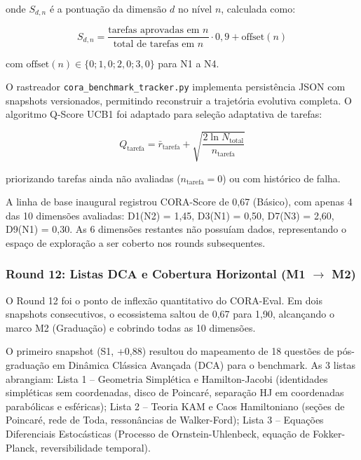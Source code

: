 onde $S_{d,n}$ é a pontuação da dimensão $d$ no nível $n$, calculada como:

\begin{equation}
S_{d,n} = \frac{\text{tarefas aprovadas em } n}{\text{total de tarefas em } n} \cdot 0{,}9 + \text{offset}(n)
\end{equation}

com $\text{offset}(n) \in \{0; 1{,}0; 2{,}0; 3{,}0\}$ para N1 a N4.

O rastreador \texttt{cora\_benchmark\_tracker.py} implementa persistência
JSON com snapshots versionados, permitindo reconstruir a trajetória
evolutiva completa. O algoritmo Q-Score UCB1 foi adaptado para seleção
adaptativa de tarefas:

\begin{equation}
Q_{\text{tarefa}} = \bar{r}_{\text{tarefa}} + \sqrt{\frac{2\ln N_{\text{total}}}{n_{\text{tarefa}}}}
\end{equation}

priorizando tarefas ainda não avaliadas ($n_{\text{tarefa}} = 0$) ou com
histórico de falha.

A linha de base inaugural registrou CORA-Score de 0,67 (Básico), com
apenas 4 das 10 dimensões avaliadas: D1(N2) = 1,45, D3(N1) = 0,50,
D7(N3) = 2,60, D9(N1) = 0,30. As 6 dimensões restantes não possuíam
dados, representando o espaço de exploração a ser coberto nos rounds
subsequentes.

\subsubsection{Round 12: Listas DCA e Cobertura Horizontal (M1 $\rightarrow$ M2)}

O Round 12 foi o ponto de inflexão quantitativo do CORA-Eval. Em dois
snapshots consecutivos, o ecossistema saltou de 0,67 para 1,90,
alcançando o marco M2 (Graduação) e cobrindo todas as 10 dimensões.

O primeiro snapshot (S1, +0,88) resultou do mapeamento de 18 questões de
pós-graduação em Dinâmica Clássica Avançada (DCA) para o benchmark. As 3
listas abrangiam: Lista 1 -- Geometria Simplética e Hamilton-Jacobi
(identidades simpléticas sem coordenadas, disco de Poincaré, separação
HJ em coordenadas parabólicas e esféricas); Lista 2 -- Teoria KAM e
Caos Hamiltoniano (seções de Poincaré, rede de Toda, ressonâncias de
Walker-Ford); Lista 3 -- Equações Diferenciais Estocásticas (Processo de
Ornstein-Uhlenbeck, equação de Fokker-Planck, reversibilidade temporal).

